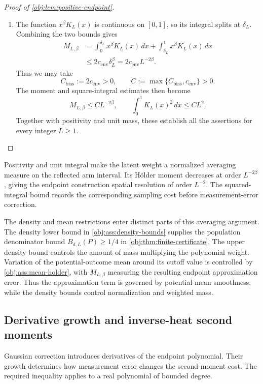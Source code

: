 \documentclass[11pt]{article}
\begin{document}
\begin{proof}[Proof of \cref{obj:lem:positive-endpoint}]
\begin{enumerate}
\item The function \(x^\beta K_L(x)\) is continuous on \([0,1]\), so its integral splits at \(\delta_L\). Combining the two bounds gives
\[
\begin{aligned}
M_{L,\beta}
&=
\int_0^{\delta_L}x^\beta K_L(x)\,dx
+
\int_{\delta_L}^1x^\beta K_L(x)\,dx\\
&\le
2c_{\mathrm{env}}\delta_L^\beta
=
2c_{\mathrm{env}}L^{-2\beta}.
\end{aligned}
\]
Thus we may take
\[
C_{\mathrm{bias}}:=2c_{\mathrm{env}}>0,
\qquad
C:=\max\{C_{\mathrm{bias}},c_{\mathrm{env}}\}>0.
\]
The moment and square-integral estimates then become
\[
M_{L,\beta}\le CL^{-2\beta},
\qquad
\int_0^1K_L(x)^2\,dx\le CL^2.
\]
Together with positivity and unit mass, these establish all the assertions for every integer \(L\ge1\).
\end{enumerate}
\end{proof}

Positivity and unit integral make the latent weight a normalized averaging measure on the reflected arm interval. Its Hölder moment decreases at order \(L^{-2\beta}\), giving the endpoint construction spatial resolution of order \(L^{-2}\). The squared-integral bound records the corresponding sampling cost before measurement-error correction.

The density and mean restrictions enter distinct parts of this averaging argument. The density lower bound in \cref{obj:ass:density-bounds} supplies the population denominator bound \(B_{d,L}(P)\ge1/4\) in \cref{obj:thm:finite-certificate}. The upper density bound controls the amount of mass multiplying the polynomial weight. Variation of the potential-outcome mean around its cutoff value is controlled by \cref{obj:ass:mean-holder}, with \(M_{L,\beta}\) measuring the resulting endpoint approximation error. Thus the approximation term is governed by potential-mean smoothness, while the density bounds control normalization and weighted mass.

\subsection{Derivative growth and inverse-heat second moments}

Gaussian correction introduces derivatives of the endpoint polynomial. Their growth determines how measurement error changes the second-moment cost. The required inequality applies to a real polynomial  of bounded degree.
\end{document}
